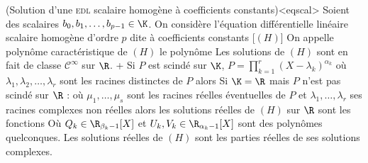 \begin{theo}(Solution d'une \textsc{edl} scalaire  homogène à coefficients constants)<eqscal>
Soient des scalaires $b_0,b_1,\ldots,b_{p-1}\in \K$. On considère l'équation différentielle linéaire scalaire homogène d'ordre $p$ dite à coefficients constants
[$(H)$]
On appelle polynôme caractéristique de $(H)$ le polynôme
\nb Les solutions de $(H)$ sont en fait de classe $\mathcal C^\infty$ sur $\R$.\endnb
\xit+ Si $P$ est scindé sur $\K$, $P=\prod_{k=1}^r(X-\lambda_k)^{\alpha_k}$ où $\lambda_1,\lambda_2,\ldots,\lambda_r$ sont les racines distinctes de $P$ alors
\xit Si $\K=\R$ mais $P$ n'est pas scindé sur $\R$ :
où $\mu_1,\ldots,\mu_s$ sont les racines réelles éventuelles de $P$ et $\lambda_1,\ldots,\lambda_r$ ses racines complexes non réelles alors les solutions réelles de $(H)$ sur $\R$ sont les fonctions
Où $Q_k\in\R_{\beta_k-1}[X]$ et $U_k,V_k\in\R_{\alpha_k-1}[X]$ sont des polynômes quelconques.
\nb Les solutions réelles de $(H)$ sont les parties réelles de ses solutions complexes.
\endnb
\exit
\end{theo}

